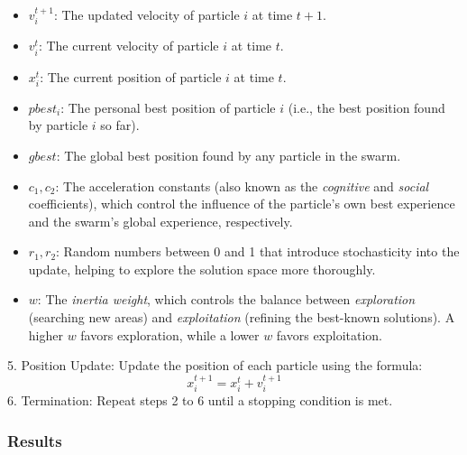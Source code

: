 \begin{itemize}
    \item \( v_i^{t+1} \): The updated velocity of particle \(i\) at time \(t+1\).
    \item \( v_i^t \): The current velocity of particle \(i\) at time \(t\).
    \item \( x_i^t \): The current position of particle \(i\) at time \(t\).
    \item \( pbest_i \): The personal best position of particle \(i\) (i.e., the best position found by particle \(i\) so far).
    \item \( gbest \): The global best position found by any particle in the swarm.
    \item \( c_1, c_2 \): The acceleration constants (also known as the \textit{cognitive} and \textit{social} coefficients), which control the influence of the particle's own best experience and the swarm's global experience, respectively.
    \item \( r_1, r_2 \): Random numbers between 0 and 1 that introduce stochasticity into the update, helping to explore the solution space more thoroughly.
    \item \( w \): The \textit{inertia weight}, which controls the balance between \textit{exploration} (searching new areas) and \textit{exploitation} (refining the best-known solutions). A higher \(w\) favors exploration, while a lower \(w\) favors exploitation.
\end{itemize}
5. Position Update: Update the position of each particle using the formula:
\newline
\begin{equation}
x_i^{t+1} = x_i^t + v_i^{t+1}
\end{equation}
6. Termination: Repeat steps 2 to 6 until a stopping condition is met.

\subsubsection{Results}

